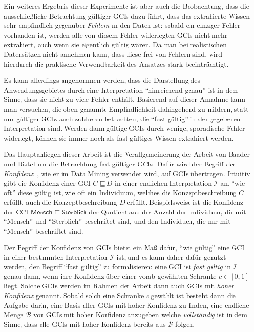 \documentclass[ngerman,fleqn,DIV=12]{scrartcl}
\begin{document}
Ein weiteres Ergebnis dieser Experimente ist aber auch die Beobachtung, dass die
ausschließliche Betrachtung gültiger GCIs dazu führt, dass das extrahierte Wissen sehr
empfindlich gegenüber \emph{Fehlern} in den Daten ist: sobald ein einziger Fehler
vorhanden ist, werden alle von diesem Fehler widerlegten GCIs nicht mehr extrahiert, auch
wenn sie eigentlich gültig wären.  Da man bei realistischen Datensätzen nicht annehmen
kann, dass diese frei von Fehlern sind, wird hierdurch die praktische Verwendbarkeit des
Ansatzes stark beeinträchtigt.

Es kann allerdings angenommen werden, dass die Darstellung des Anwendungsgebietes durch
eine Interpretation \enquote{hinreichend genau} ist in dem Sinne, dass sie nicht zu viele
Fehler enthält.  Basierend auf dieser Annahme kann man versuchen, die oben genannte
Empfindlichkeit dahingehend zu mildern, statt nur gültiger GCIs auch solche zu betrachten,
die \enquote{fast gültig} in der gegebenen Interpretation sind.  Werden dann gültige GCIs
durch wenige, sporadische Fehler widerlegt, können sie immer noch als fast gültiges Wissen
extrahiert werden.

Das Hauptanliegen dieser Arbeit ist die Verallgemeinerung der Arbeit von Baader und Distel
um die Betrachtung fast gültiger GCIs.  Dafür wird der Begriff der
\emph{Konfidenz}~\cite{arules:agrawal:association-rules}, wie er im Data Mining verwendet
wird, auf GCIs übertragen.  Intuitiv gibt die Konfidenz einer GCI $C \sqsubseteq D$ in
einer endlichen Interpretation $\mathcal{I}$ an, \enquote{wie oft} diese gültig ist, \dh
wie oft ein Individuum, welches die Konzeptbeschreibung $C$ erfüllt, auch die
Konzeptbeschreibung $D$ erfüllt.  Beispielsweise ist die Konfidenz der GCI
$\mathsf{Mensch} \sqsubseteq \mathsf{Sterblich}$ der Quotient aus der Anzahl der
Individuen, die mit \enquote{\textsf{Mensch}} und \enquote{\textsf{Sterblich}} beschriftet
sind, und den Individuen, die nur mit \enquote{\textsf{Mensch}} beschriftet sind.

Der Begriff der Konfidenz von GCIs bietet ein Maß dafür, \enquote{wie gültig} eine GCI in
einer bestimmten Interpretation $\mathcal{I}$ ist, und es kann daher dafür genutzt werden,
den Begriff \enquote{fast gültig} zu formalisieren: eine GCI ist \emph{fast gültig} in
$\mathcal{I}$ genau dann, wenn ihre Konfidenz über einer vorab gewählten Schranke $c \in
[0,1]$ liegt.  Solche GCIs werden im Rahmen der Arbeit dann auch GCIs mit \emph{hoher
  Konfidenz} genannt.  Sobald solch eine Schranke $c$ gewählt ist besteht dann die Aufgabe
darin, eine Basis aller GCIs mit hoher Konfidenz zu finden, \dh eine endliche Menge
$\mathcal{B}$ von GCIs mit hoher Konfidenz anzugeben welche \emph{vollständig} ist in dem
Sinne, dass alle GCIs mit hoher Konfidenz bereits aus $\mathcal{B}$ folgen.
\end{document}
